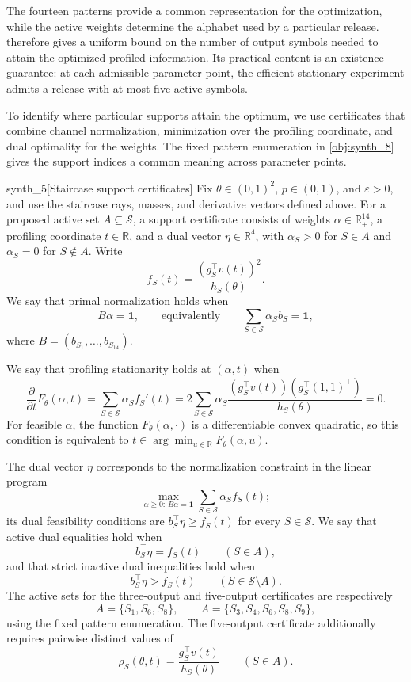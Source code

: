 \documentclass[11pt]{article}
\begin{document}
The fourteen patterns provide a common representation for the optimization, while the active weights determine the alphabet used by a particular release.  therefore gives a uniform bound on the number of output symbols needed to attain the optimized profiled information. Its practical content is an existence guarantee: at each admissible parameter point, the efficient stationary experiment admits a release with at most five active symbols.

To identify where particular supports attain the optimum, we use certificates that combine channel normalization, minimization over the profiling coordinate, and dual optimality for the weights. The fixed pattern enumeration in \cref{obj:synth_8} gives the support indices a common meaning across parameter points.

\begin{definitionv}{synth_5}[Staircase support certificates]
Fix \(\theta\in(0,1)^2\), \(p\in(0,1)\), and \(\varepsilon>0\), and use the staircase rays, masses, and derivative vectors defined above. For a proposed active set \(A\subseteq\mathcal S\), a support certificate consists of weights \(\alpha\in\mathbb R_+^{14}\), a profiling coordinate \(t\in\mathbb R\), and a dual vector \(\eta\in\mathbb R^4\), with \(\alpha_S>0\) for \(S\in A\) and \(\alpha_S=0\) for \(S\notin A\). Write
\[
f_S(t)=\frac{(g_S^\top v(t))^2}{h_S(\theta)}.
\]
We say that primal normalization holds when
\[
B\alpha=\mathbf1,
\qquad\text{equivalently}\qquad
\sum_{S\in\mathcal S}\alpha_S b_S=\mathbf1,
\]
where \(B=(b_{S_1},\ldots,b_{S_{14}})\).

We say that profiling stationarity holds at \((\alpha,t)\) when
\[
\frac{\partial}{\partial t}F_\theta(\alpha,t)
=\sum_{S\in\mathcal S}\alpha_S f_S'(t)
=2\sum_{S\in\mathcal S}\alpha_S
\frac{(g_S^\top v(t))(g_S^\top(1,1)^\top)}{h_S(\theta)}
=0.
\]
For feasible \(\alpha\), the function \(F_\theta(\alpha,\cdot)\) is a differentiable convex quadratic, so this condition is equivalent to \(t\in\arg\min_{u\in\mathbb R}F_\theta(\alpha,u)\).

The dual vector \(\eta\) corresponds to the normalization constraint in the linear program
\[
\max_{\alpha\ge0:\,B\alpha=\mathbf1}
\sum_{S\in\mathcal S}\alpha_S f_S(t);
\]
its dual feasibility conditions are \(b_S^\top\eta\ge f_S(t)\) for every \(S\in\mathcal S\). We say that active dual equalities hold when
\[
b_S^\top\eta=f_S(t)\qquad(S\in A),
\]
and that strict inactive dual inequalities hold when
\[
b_S^\top\eta>f_S(t)\qquad(S\in\mathcal S\setminus A).
\]
The active sets for the three-output and five-output certificates are respectively
\[
A=\{S_1,S_6,S_8\},
\qquad
A=\{S_3,S_4,S_6,S_8,S_9\},
\]
using the fixed pattern enumeration. The five-output certificate additionally requires pairwise distinct values of
\[
\rho_S(\theta,t)=\frac{g_S^\top v(t)}{h_S(\theta)}
\qquad(S\in A).
\]
\end{definitionv}
\end{document}
